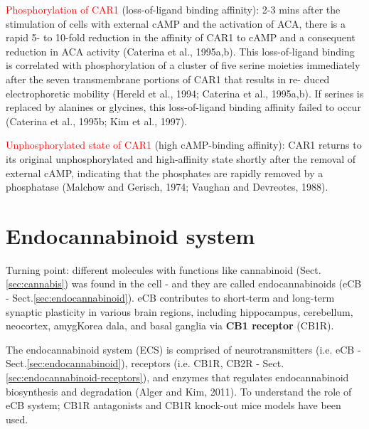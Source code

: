 \textcolor{red}{Phosphorylation of CAR1} (loss-of-ligand binding affinity):
2-3 mins after the stimulation of cells with external cAMP and the activation of
ACA, there is a rapid 5- to 10-fold reduction in the affinity of CAR1  to  cAMP
and  a  consequent reduction  in  ACA activity  (Caterina et al.,  1995a,b).
This  loss-of-ligand binding is correlated with phosphorylation of a cluster of
five  serine  moieties  immediately  after the seven transmembrane portions of
CAR1  that  results  in  re- duced  electrophoretic  mobility  (Hereld et al.,
1994; Caterina et  al.,  1995a,b). If serines is replaced by alanines or
glycines, this loss-of-ligand binding affinity failed to occur (Caterina et 
al.,  1995b; Kim et al., 1997).


\textcolor{red}{Unphosphorylated state of CAR1} (high cAMP-binding affinity):
CAR1  returns  to  its  original unphosphorylated and high-affinity state
shortly after the  removal  of  external  cAMP,  indicating  that  the
phosphates  are  rapidly  removed  by  a  phosphatase (Malchow and Gerisch,
1974; Vaughan and Devreotes, 1988).



\section{Endocannabinoid system}
\label{sec:endocannabinoid-system}

Turning point: different molecules with functions like cannabinoid
(Sect.\ref{sec:cannabis}) was found in the cell - and they are called
endocannabinoids (eCB - Sect.\ref{sec:endocannabinoid}).  eCB contributes to
short-term and long-term synaptic plasticity in various brain regions, including
hippocampus, cerebellum, neocortex, amygKorea dala, and basal ganglia via {\bf
CB1 receptor} (CB1R).

The endocannabinoid system (ECS) is comprised of neurotransmitters (i.e. eCB -
Sect.\ref{sec:endocannabinoid}), receptors (i.e. CB1R, CB2R -
Sect.\ref{sec:endocannabinoid-receptors}), and enzymes that regulates
endocannabinoid biosynthesis and degradation (Alger and Kim, 2011).
To understand the role of eCB system; CB1R antagonists and CB1R knock-out mice
models have been used.

% 
% 



